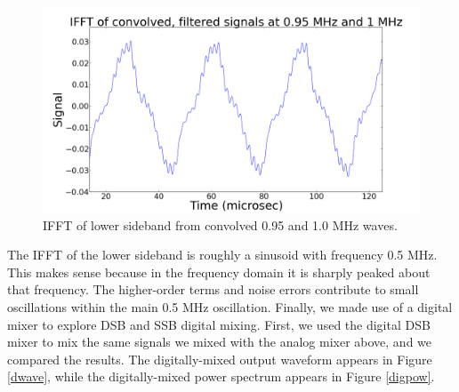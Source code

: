 \documentclass[11pt]{article}
\begin{document}
\begin{figure}
\centering
\includegraphics[scale=0.35]{pictures/ifft}
\caption{IFFT of lower sideband from convolved 0.95 and 1.0 MHz waves. \label{ifft}}
\end{figure}

The IFFT of the lower sideband is roughly a sinusoid with frequency 0.5 MHz. This makes sense because in the frequency domain it is sharply peaked about that frequency. The higher-order terms and noise errors contribute to small oscillations within the main 0.5 MHz oscillation. Finally, we made use of a digital mixer to explore DSB and SSB digital mixing. First, we used the digital DSB mixer to mix the same signals we mixed with the analog mixer above, and we compared the results. The digitally-mixed output waveform appears in Figure \ref{dwave}, while the digitally-mixed power spectrum appears in Figure \ref{digpow}.
\end{document}
